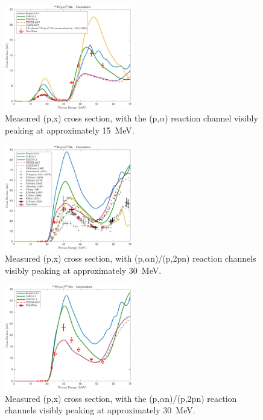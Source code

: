 \begin{figure}
 \centering
 \includegraphics[width=0.5\textwidth]{./figures/51Mn.pdf}
 \caption{Measured (p,x) cross section, with the (p,$\alpha$) reaction channel visibly peaking at approximately \mbox{15 MeV}.}
 \label{fig:51Mn}
\end{figure}





\begin{figure}
 \centering
 \includegraphics[width=0.5\textwidth]{./figures/52Mn.pdf}
 \caption{Measured (p,x) cross section, with (p,$\alpha$n)/(p,2pn) reaction channels visibly peaking at approximately \mbox{30 MeV}.}
 \label{fig:temp_52Mn}
\end{figure}




\begin{figure}
 \centering
 \includegraphics[width=0.5\textwidth]{./figures/52mMn.pdf}
 \caption{Measured (p,x) cross section, with the (p,$\alpha$n)/(p,2pn) reaction channels visibly peaking at approximately \mbox{30 MeV}.}
 \label{fig:temp_52mMn}
\end{figure}



